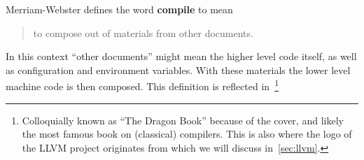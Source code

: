 Merriam-Webster defines the word \textbf{compile} to mean~\cite{compiledef}
\begin{quote}
    to compose out of materials from other documents.
\end{quote}
In this context ``other documents'' might mean the higher level code itself, as well as configuration and environment variables.
With these materials the lower level machine code is then composed.
This definition is reflected in~\footnote{Colloquially known as ``The Dragon Book'' because of the cover, and likely the most famous book on (classical) compilers. This is also where the logo of the LLVM project originates from which we will discuss in~\cref{sec:llvm}.}
